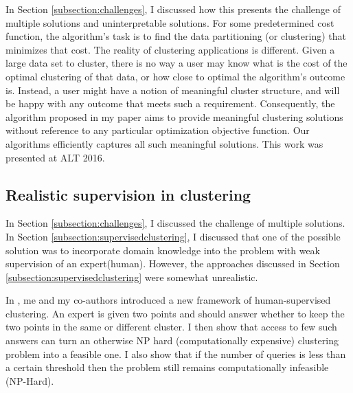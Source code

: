 \documentclass[11pt]{article}
\begin{document}
In Section \ref{subsection:challenges}, I discussed how this presents the challenge of multiple solutions and uninterpretable solutions. For some predetermined cost function, the algorithm's task is to find the data partitioning (or clustering) that minimizes that cost. The reality of clustering applications is different. Given a large data set to cluster, there is no way a user may know what is the cost of the optimal clustering of that data, or how close to optimal the algorithm's outcome is. Instead, a user might have a notion of meaningful cluster structure, and will be happy with any outcome that meets such a requirement. Consequently, the algorithm proposed in my paper \cite{kushagra2016finding} aims to provide meaningful clustering solutions without reference to any particular optimization objective function. Our algorithms efficiently captures all such meaningful solutions. This work was presented at ALT 2016. 


\subsection{Realistic supervision in clustering}
In Section \ref{subsection:challenges}, I discussed the challenge of multiple solutions. In Section \ref{subsection:supervisedclustering}, I discussed that one of the possible solution was to incorporate domain knowledge into the problem with weak supervision of an expert(human). However, the approaches discussed in Section \ref{subsection:supervisedclustering} were somewhat unrealistic. 

In \cite{ashtiani2016clustering}, me and my co-authors introduced a new framework of human-supervised clustering. An expert is given two points and should answer whether to keep the two points in the same or different cluster. I then show that access to few such answers can turn an otherwise NP hard (computationally expensive) clustering problem into a feasible one. I also show that if the number of queries is less than a certain threshold then the problem still remains computationally infeasible (NP-Hard). 
\end{document}
